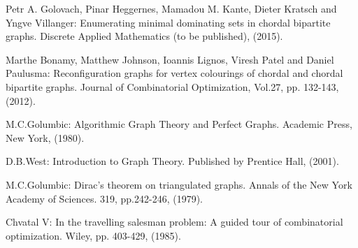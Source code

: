 \documentclass[runningheads]{llncs}
\begin{document}
\begin{thebibliography}{}
Petr A. Golovach, Pinar Heggernes, Mamadou M. Kante, Dieter Kratsch and Yngve Villanger: Enumerating minimal dominating sets in chordal bipartite graphs. Discrete Applied Mathematics (to be published), (2015).

Marthe Bonamy, Matthew Johnson, Ioannis Lignos, Viresh Patel and Daniel Paulusma: Reconfiguration graphs for vertex colourings of chordal and chordal bipartite graphs. Journal of Combinatorial Optimization, Vol.27, pp. 132-143, (2012).


M.C.Golumbic: Algorithmic Graph Theory and Perfect Graphs. Academic Press, New York, (1980).


D.B.West: Introduction to Graph Theory. Published by Prentice Hall, (2001).

M.C.Golumbic: Dirac's theorem on triangulated graphs. Annals of the New York Academy of Sciences. 319, pp.242-246, (1979).

Chvatal V: In the travelling salesman problem: A guided tour of combinatorial optimization. Wiley, pp. 403-429, (1985).

\end{thebibliography}
\end{document}
